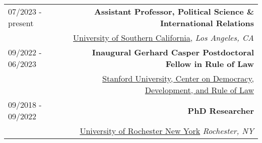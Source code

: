 \begin{tabular}{L!{\VRule}R}
07/2023 - present & {\small \bf Assistant Professor, Political Science \& International Relations}  \\ &
  \href{https://dornsife.usc.edu/poir/}{University of Southern California}, \emph{Los Angeles, CA} \\ [3pt]
09/2022 - 06/2023 & {\small \bf Inaugural Gerhard Casper Postdoctoral Fellow in Rule of Law}  \\ &
  \href{https://cddrl.fsi.stanford.edu/}{Stanford University, Center on Democracy, Development, and Rule of Law} \\ [3pt]
    09/2018 - 09/2022 & {\small \bf PhD Researcher }  \\ &
  \href{https://www.sas.rochester.edu/psc/}{University of Rochester New York} \emph{Rochester, NY}\\




\end{tabular}
